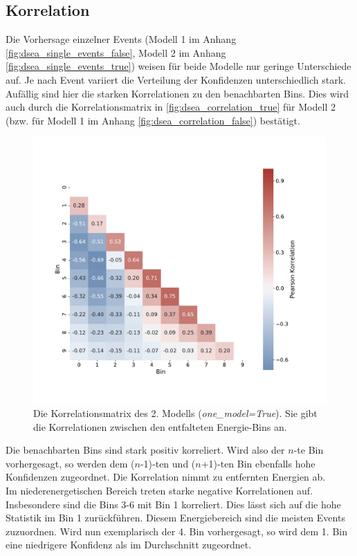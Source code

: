 \subsection{Korrelation} \label{sec:dsea_correlation}
Die Vorhersage einzelner Events (Modell 1 im Anhang \ref{fig:dsea_single_events_false}, Modell 2 im Anhang \ref{fig:dsea_single_events_true}) weisen für beide Modelle nur geringe Unterschiede auf.
Je nach Event variiert die Verteilung der Konfidenzen unterschiedlich stark.
\\
Aufällig sind hier die starken Korrelationen zu den benachbarten Bins.
Dies wird auch durch die Korrelationsmatrix in \autoref{fig:dsea_correlation_true} für Modell 2 (bzw. für Modell 1 im Anhang \ref{fig:dsea_correlation_false}) bestätigt.
\begin{figure}
    \centering
    \includegraphics[width=1\textwidth]{Plots/DSEA/True/correlation_matrix.pdf}
    \caption[Korrelationsmatrix des 2. Modells in DSEA]{Die Korrelationsmatrix des 2. Modells (\textit{one\_model=True}).
    Sie gibt die Korrelationen zwischen den entfalteten Energie-Bins an.
    }
    \label{fig:dsea_correlation_true}
\end{figure}
Die benachbarten Bins sind stark positiv korreliert.
Wird also der $n$-te Bin vorhergesagt, so werden dem ($n$-1)-ten und ($n$+1)-ten Bin ebenfalls hohe Konfidenzen zugeordnet.
Die Korrelation nimmt zu entfernten Energien ab.
\\
Im niederenergetischen Bereich treten starke negative Korrelationen auf.
Insbesondere sind die Bins 3-6 mit Bin 1 korreliert.
Dies lässt sich auf die hohe Statistik im Bin 1 zurückführen.
Diesem Energiebereich sind die meisten Events zuzuordnen.
Wird nun exemplarisch der 4. Bin vorhergesagt, so wird dem 1. Bin eine niedrigere Konfidenz als im Durchschnitt zugeordnet.
